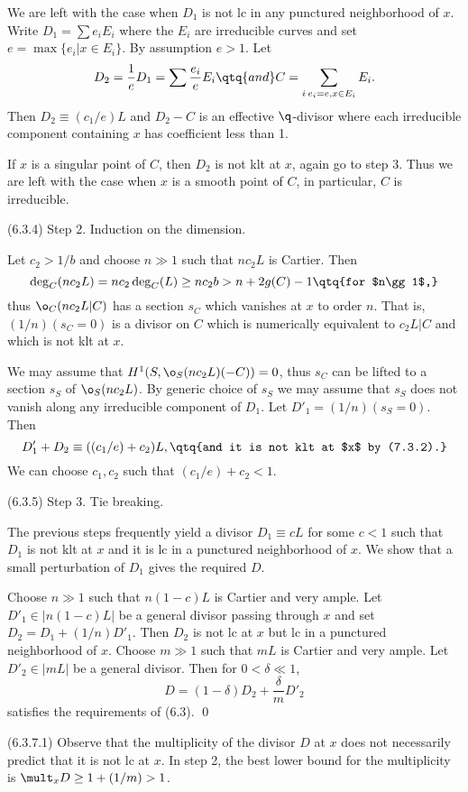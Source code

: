 We are left with the case when $D_1$ is not lc in any punctured neighborhood
of $x$.  Write $D_1=\sum e_iE_i$  where the $E_i$ are irreducible curves and
set $e=\max\{e_i\vert x\in E_i\}$. By assumption $e> 1$.  Let 
$$
D_2=\frac1{e}D_1=\sum \frac{e_i}{e}E_i\qtq{and} C=\sum_{i\:e_i=e, x\in E_i}
E_i.
$$
Then $D_2\equiv (c_1/e)L$ and $D_2-C$ is an effective $\q$-divisor where each
irreducible component containing $x$ has coefficient less than 1. 

If $x$ is a singular point of $C$, then $D_2$ is not klt at $x$, again go to
step 3. Thus we
are left with the case when $x$ is a smooth point of $C$, in particular, $C$ is
irreducible.

(6.3.4) Step 2. Induction on the dimension.

Let $c_2>1/b$ and choose $n\gg 1$ such that $nc_2L$ is Cartier.
Then 
$$
\deg_C(nc_2L)=nc_2\deg_C(L)\geq nc_2 b >n+2g(C)-1\qtq{for $n\gg 1$,}
$$
 thus $\o_C(nc_2L|C)$  has a section 
$s_C$ which vanishes at $x$ to order $n$. That is, $(1/n)(s_C=0)$ is a
divisor on $C$ which is numerically equivalent to $c_2L|C$ and which is not
klt at $x$. 

We may assume that
$H^1(S,\o_S(nc_2L)(-C))=0$, thus $s_C$ can be lifted to a section $s_S$ of
$\o_S(nc_2L)$.  By generic choice of $s_S$ we may assume that $s_S$ does not
vanish along any irreducible component of $D_1$.  Let $D'_1=(1/n)(s_S=0)$.  
Then
$$
D'_1+D_2\equiv ((c_1/e)+c_2)L,\qtq{and it is not klt at $x$ by (7.3.2).}
$$
We can choose $c_1, c_2$ such that $(c_1/e)+c_2<1$. 


(6.3.5) Step 3. Tie breaking.

The previous steps frequently yield a divisor 
 $D_1\equiv cL$ for some $c<1$ such that
$D_1$  is not klt at
$x$ and it is
lc in a punctured neighborhood of $x$.  We show that a small perturbation of
$D_1$ gives the required $D$.


Choose $n\gg 1$ such that $n(1-c)L$
is Cartier and very ample. Let 
$D'_1\in |n(1-c)L|$ be a general divisor  passing through $x$ and set
$D_2=D_1+(1/n)D'_1$. Then $D_2$  is not lc at $x$ but lc 
in a punctured neighborhood of $x$.  Choose $m\gg 1$ such that $mL$
is Cartier and very ample. Let 
$D'_2\in |mL|$ be a general divisor. Then for $0<\delta\ll 1$,
$$
D=(1-\delta)D_2+\frac{\delta}{m}D'_2
$$
satisfies the
requirements of (6.3).
\qed\enddemo



(6.3.7.1) Observe that the multiplicity of the  divisor $D$ at $x$ does not
necessarily predict that it is not lc at $x$. In step 2, the best lower bound
for the multiplicity is $\mult_xD\geq 1+(1/m)>1$. 


